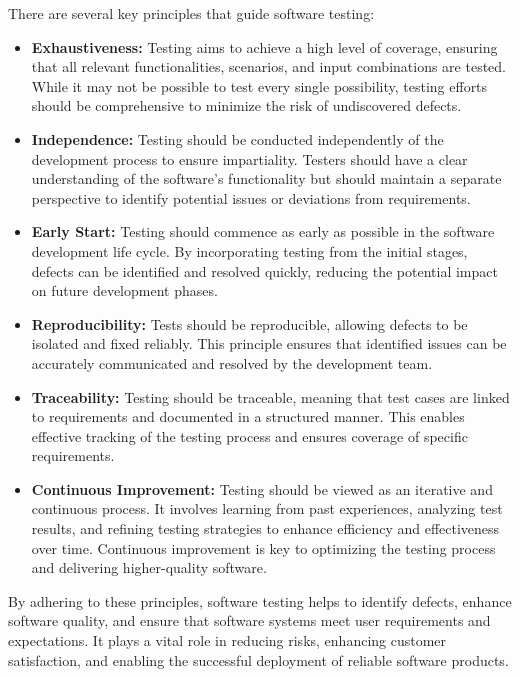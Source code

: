 There are several key principles that guide software testing:

\begin{itemize}[label={}]
    \item \textbf{Exhaustiveness:} Testing aims to achieve a high level of coverage, ensuring that all relevant functionalities, scenarios, and input combinations are tested. While it may not be possible to test every single possibility, testing efforts should be comprehensive to minimize the risk of undiscovered defects.
    
    \item \textbf{Independence:} Testing should be conducted independently of the development process to ensure impartiality. Testers should have a clear understanding of the software's functionality but should maintain a separate perspective to identify potential issues or deviations from requirements.
    
    \item \textbf{Early Start:} Testing should commence as early as possible in the software development life cycle. By incorporating testing from the initial stages, defects can be identified and resolved quickly, reducing the potential impact on future development phases.

    \item \textbf{Reproducibility:} Tests should be reproducible, allowing defects to be isolated and fixed reliably. This principle ensures that identified issues can be accurately communicated and resolved by the development team.

    \item \textbf{Traceability:} Testing should be traceable, meaning that test cases are linked to requirements and documented in a structured manner. This enables effective tracking of the testing process and ensures coverage of specific requirements.

    \item \textbf{Continuous Improvement:} Testing should be viewed as an iterative and continuous process. It involves learning from past experiences, analyzing test results, and refining testing strategies to enhance efficiency and effectiveness over time. Continuous improvement is key to optimizing the testing process and delivering higher-quality software.
\end{itemize}

By adhering to these principles, software testing helps to identify defects, enhance software quality, and ensure that software systems meet user requirements and expectations. It plays a vital role in reducing risks, enhancing customer satisfaction, and enabling the successful deployment of reliable software products.

